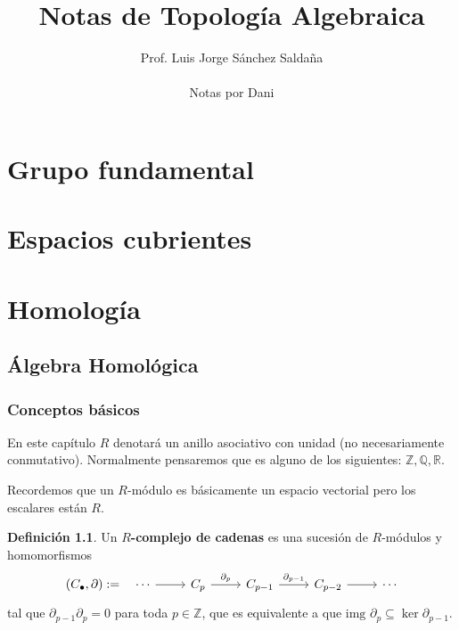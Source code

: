 \documentclass[spanish]{book}
\title{Notas de Topología Algebraica}
\author{Prof. Luis Jorge Sánchez Saldaña\\ \\ Notas por Dani}
\theoremstyle{definition}
\newtheorem*{defn}{Definición}
\newcommand{\R}{\mathbb{R}}
\newcommand{\Z}{\mathbb{Z}}
\newcommand{\Q}{\mathbb{Q}}
\begin{document}
	\maketitle
	\tableofcontents
	
	\part{Grupo fundamental}
	
	\part{Espacios cubrientes}
	
	\part{Homología}
	\chapter{Álgebra Homológica}
	\section{Conceptos básicos}
	En este capítulo $R$ denotará un anillo asociativo con unidad (no necesariamente conmutativo). Normalmente pensaremos que es alguno de los siguientes: $\Z, \Q, \R$.
	
	Recordemos que un $R$-módulo es básicamente un espacio vectorial pero los escalares están $R$.
	\begin{defn}
		Un \textbf{$R$-complejo de cadenas} es una sucesión de $R$-módulos y homomorfismos
		\[\begin{tikzcd}
			(C_\bullet,\partial):= \quad \cdots \arrow{r} & C_p \arrow{r}{\partial_p} & C_{p-1} \arrow{r}{\partial_{p-1}} & C_{p-2} \arrow{r} & \cdots
		\end{tikzcd}\]
		tal que $\partial_{p-1}\partial_p=0$ para toda $p\in \mathbb{Z}$, que es equivalente a que $\text{img }\partial_p\subseteq\ker{\partial_{p-1}}$.
	\end{defn}
	
\end{document}
